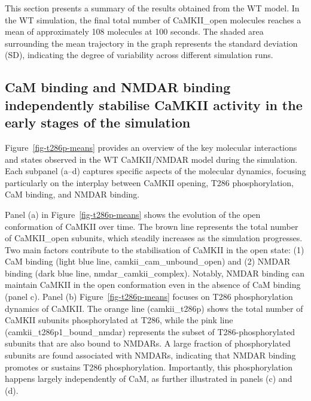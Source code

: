 \documentclass[
  11pt,
  letterpaper,
]{scrreprt}
\begin{document}
This section presents a summary of the results obtained from the WT
model. In the WT simulation, the final total number of CaMKII\_open
molecules reaches a mean of approximately 108 molecules at 100 seconds.
The shaded area surrounding the mean trajectory in the graph represents
the standard deviation (SD), indicating the degree of variability across
different simulation runs.

\subsection{CaM binding and NMDAR binding independently stabilise CaMKII
activity in the early stages of the
simulation}\label{cam-binding-and-nmdar-binding-independently-stabilise-camkii-activity-in-the-early-stages-of-the-simulation}

Figure~\ref{fig-t286p-means} provides an overview of the key molecular
interactions and states observed in the WT CaMKII/NMDAR model during the
simulation. Each subpanel (a--d) captures specific aspects of the
molecular dynamics, focusing particularly on the interplay between
CaMKII opening, T286 phosphorylation, CaM binding, and NMDAR binding.

Panel (a) in Figure~\ref{fig-t286p-means} shows the evolution of the
open conformation of CaMKII over time. The brown line represents the
total number of CaMKII\_open subunits, which steadily increases as the
simulation progresses. Two main factors contribute to the stabilisation
of CaMKII in the open state: (1) CaM binding (light blue line,
camkii\_cam\_unbound\_open) and (2) NMDAR binding (dark blue line,
nmdar\_camkii\_complex). Notably, NMDAR binding can maintain CaMKII in
the open conformation even in the absence of CaM binding (panel c).
Panel (b) Figure~\ref{fig-t286p-means} focuses on T286 phosphorylation
dynamics of CaMKII. The orange line (camkii\_t286p) shows the total
number of CaMKII subunits phosphorylated at T286, while the pink line
(camkii\_t286p1\_bound\_nmdar) represents the subset of
T286-phosphorylated subunits that are also bound to NMDARs. A large
fraction of phosphorylated subunits are found associated with NMDARs,
indicating that NMDAR binding promotes or sustains T286 phosphorylation.
Importantly, this phosphorylation happens largely independently of CaM,
as further illustrated in panels (c) and (d).
\end{document}
